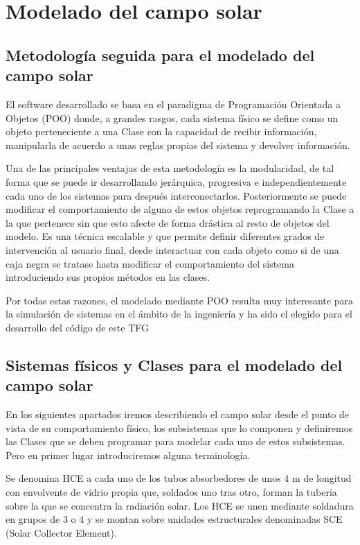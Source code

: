 \chapter{Modelado del campo solar}
\label{modeladodelcamposolar}

\section{Metodología seguida para el modelado del campo solar}

El software desarrollado se basa en el paradigma de Programación Orientada a Objetos (POO) donde, a grandes rasgos, cada sistema físico se define como un objeto perteneciente a una Clase con la capacidad de recibir información, manipularla de acuerdo a unas reglas propias del sistema y devolver información.

Una de las principales ventajas de esta metodología es la modularidad, de tal forma que se puede ir desarrollando jerárquica, progresiva e independientemente cada uno de los sistemas para después interconectarlos. Posteriormente se puede modificar el comportamiento de alguno de estos objetos reprogramando la Clase a la que pertenece sin que esto afecte de forma drástica al resto de objetos del modelo. Es una técnica escalable y que permite definir diferentes grados de intervención al usuario final, desde interactuar con cada objeto como si de una caja negra se tratase hasta modificar el comportamiento del sistema introduciendo sus propios métodos en las clases.

Por todas estas razones, el modelado mediante POO resulta muy interesante para la simulación de sistemas en el ámbito de la ingeniería y ha sido el elegido para el desarrollo del código de este TFG 

\section{Sistemas físicos y Clases para el modelado del campo solar}

En los siguientes apartados iremos describiendo el campo solar desde el punto de vista de su comportamiento físico, los subsistemas que lo componen y definiremos las Clases que se deben programar para modelar cada uno de estos subsistemas. Pero en primer lugar introduciremos alguna terminología.

Se denomina HCE a cada uno de los tubos absorbedores de unos 4 m de longitud con envolvente de vidrio propia que, soldados uno tras otro, forman la tubería sobre la que se concentra la radiación solar. Los HCE se unen mediante soldadura en grupos de 3 o 4 y se montan sobre unidades estructurales denominadas SCE (Solar Collector Element).  

